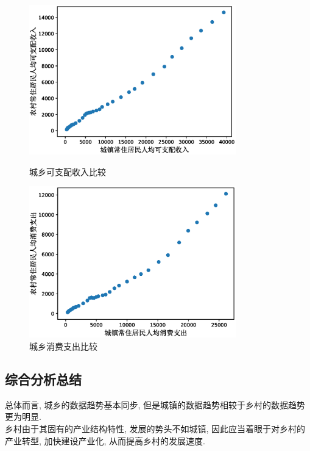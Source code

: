\documentclass{article}
\begin{document}
\begin{figure}[H]
  \centering
  \begin{minipage}[t]{0.48\textwidth}
    \centering
    \includegraphics[width=0.8\textwidth]{figures/comparison3.eps}
    \caption{城乡可支配收入比较}
    \label{fig:side:g}
  \end{minipage}
  \begin{minipage}[t]{0.48\textwidth}
    \centering
    \includegraphics[width=0.8\textwidth]{figures/comparison4.eps}
    \caption{城乡消费支出比较}
    \label{fig:side:h}
  \end{minipage}
\end{figure}

\subsection{综合分析总结}

总体而言, 城乡的数据趋势基本同步, 但是城镇的数据趋势相较于乡村的数据趋势更为明显.\\
\indent 乡村由于其固有的产业结构特性, 发展的势头不如城镇, 因此应当着眼于对乡村的产业转型, 加快建设产业化, 从而提高乡村的发展速度.\\
\end{document}
